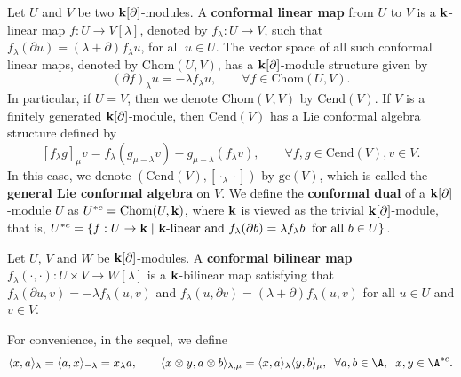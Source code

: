 \documentclass[12pt]{amsart}
\begin{document}
    \begin{definition}\cite{K1}
        Let $U$ and $V$ be two ${\bf k}[\partial]$-modules. A {\bf conformal linear map} from $U$ to $V$ is a ${\bf k}$-linear map $f:U\rightarrow V[\lambda]$, denoted by $f_\lambda:U\rightarrow V$,   such that  $f_\lambda(\partial u)=(\lambda+\partial) f_\lambda u$, for all $u\in U$.
        The vector space of all such conformal linear maps, denoted by $\text{Chom}(U,V)$, has a $ {\bf k}[\partial]$-module structure given by
        \begin{equation*}
            (\partial f)_\lambda u=-\lambda f_\lambda u,\qquad \forall f\in \text{Chom}(U,V).
        \end{equation*}
        In particular, if $U=V$, then we denote $\text{Chom}(V,V)$ by  $\text{Cend}(V)$. If $V$ is a finitely generated  $ {\bf k}[\partial]$-module, then  $\text{Cend}(V)$ has a Lie conformal  algebra structure defined by
        $$
        [f_\lambda g]_\mu v=f_\lambda(g_{\mu-\lambda}v)-g_{\mu-\lambda}(f_\lambda v),\qquad \forall f,g\in \text{Cend}(V),v\in V.
        $$
        In this case, we denote $(\text{Cend}(V),[\cdot_\lambda\cdot])$ by $\text{gc}(V)$, which is called the {\bf general Lie conformal algebra}  on $V$.
        We define the {\bf conformal dual} of a $ {\bf k}[\partial]$-module $U$ as $ U^{*c}=\text{Chom}(U,{\bf k})$, where ${\bf k}$ is viewed as the trivial ${\bf k}[\partial]$-module, that is,
        $U^{*c}=\{f: U\rightarrow {\bf k}\;| \text{ ${\bf k}$-linear and }f_\lambda(\partial b)=\lambda f_\lambda b \;\;\text{for all $b\in U$}\} $.

        Let $U$, $V$ and $W$ be ${\bf k} [\partial]$-modules.   A {\bf conformal bilinear map}   $f_\lambda(\cdot,\cdot): U\times V\rightarrow W[\lambda]$  is a ${\bf k}$-bilinear map satisfying that $f_\lambda(\partial u,v)=-\lambda f_\lambda(u,v)$ and $f_\lambda( u,\partial v)=(\lambda+\partial) f_\lambda(u,v) $ for all $u\in U$ and $v\in V$.
    \end{definition}

    For convenience, in the sequel, we define
    \begin{eqnarray*}
        \langle x,a\rangle_\lambda=\langle a, x\rangle_{-\lambda}=x_\lambda a,\qquad
        \langle x\otimes y, a\otimes b\rangle_{\lambda, \mu}=\langle x, a\rangle_\lambda \langle y,b\rangle_\mu,\;\;\forall a, b\in \A,\;\;x, y\in \A^{\ast c}.
    \end{eqnarray*}
\end{document}
